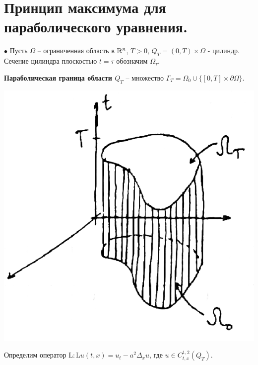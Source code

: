 
\section{Принцип максимума для параболического уравнения.}
$\bullet$ Пусть $\Omega$ -- ограниченная область в $\mathbb{R}^n$, $T > 0$, 
$Q_T = (0,T) \times \Omega$ - цилиндр. Сечение цилиндра плоскостью $t = \tau$ обозначим $\Omega_\tau$.

\begin{definition}
{\bf Параболическая граница области $Q_T$} -- множество $\Gamma_T = \Omega_0 \cup \{[0,T] \times \partial{\Omega} \}$.
\end{definition}
\begin{center}
\includegraphics[scale=0.5]{13_1_new}
\end{center}

Определим оператор $\mathrm{L} : \mathrm{L}u(t,x) = u_t - a^2 \Delta_xu$, где 
$u \in C_{t, x}^{1,2}(Q_T)$.

